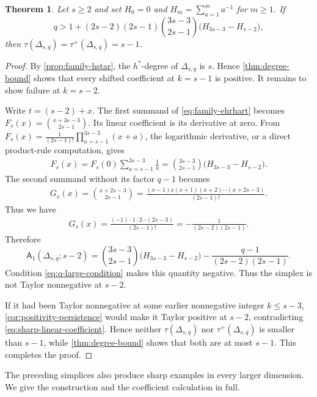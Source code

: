 \documentclass[reqno, 12pt]{article}
\numberwithin{equation}{section}
\newtheorem{theorem}{Theorem}[section]
\theoremstyle{definition}
\newcommand{\A}{\mathsf{A}}
\begin{document}
\begin{theorem}\label{thm:sharp-center}
Let $s\geq2$ and set $H_0=0$ and $H_m=\sum_{a=1}^{m}a^{-1}$ for $m\geq1$.
If
\begin{equation}\label{eq:q-large-condition}
 q>1+(2s-2)(2s-1)\binom{3s-3}{2s-1}\bigl(H_{3s-3}-H_{s-2}\bigr),
\end{equation}
then $\tau(\Delta_{s,q})=\tau^+(\Delta_{s,q})=s-1$.
\end{theorem}
\begin{proof}
By \cref{prop:family-hstar}, the $h^*$-degree of $\Delta_{s,q}$ is $s$.
Hence \cref{thm:degree-bound} shows that every shifted coefficient at $k=s-1$ is positive.  It remains to show failure at $k=s-2$.

Write $t=(s-2)+x$.  The first summand of \eqref{eq:family-ehrhart} becomes $F_s(x)=\binom{x+3s-3}{2s-1}$.
Its linear coefficient is its derivative at zero.  
From $F_s(x)=\frac1{(2s-1)!}\prod_{a=s-1}^{3s-3}(x+a)$, 
the logarithmic derivative, or a direct product-rule computation, gives
\begin{align*}
[x]F_s(x)=F_s(0)\sum_{a=s-1}^{3s-3}\frac1a =\binom{3s-3}{2s-1}\bigl(H_{3s-3}-H_{s-2}\bigr).
\end{align*}
The second summand without its factor $q-1$ becomes
\begin{align*}
 G_s(x)=\binom{x+2s-3}{2s-1}=\frac{(x-1)x(x+1)(x+2)\cdots(x+2s-3)}{(2s-1)!}.
\end{align*}
Thus we have 
\begin{align*}
 [x]G_s(x)=\frac{(-1)\cdot1\cdot2\cdots(2s-3)}{(2s-1)!}=-\frac{1}{(2s-2)(2s-1)}.
\end{align*}
Therefore
\begin{equation}\label{eq:sharp-linear-coefficient}
 \A_1(\Delta_{s,q};s-2)=\binom{3s-3}{2s-1}\bigl(H_{3s-3}-H_{s-2}\bigr)-\frac{q-1}{(2s-2)(2s-1)}.
\end{equation}
Condition \eqref{eq:q-large-condition} makes this quantity negative.
Thus the simplex is not Taylor nonnegative at $s-2$.

If it had been Taylor nonnegative at some earlier nonnegative integer
$k\leq s-3$, \cref{cor:positivity-persistence} would make it Taylor
positive at $s-2$, contradicting
\eqref{eq:sharp-linear-coefficient}.  Hence neither $\tau(\Delta_{s,q})$
nor $\tau^+(\Delta_{s,q})$ is smaller
than $s-1$, while \cref{thm:degree-bound} shows that both are at most
$s-1$. This completes the proof.
\end{proof}

The preceding simplices also produce sharp examples in every larger
dimension.  We give the construction and the coefficient calculation in
full.
\end{document}

